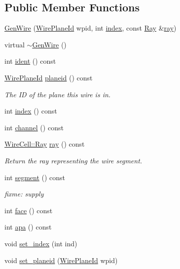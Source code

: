 \subsection*{Public Member Functions}
\begin{DoxyCompactItemize}
\item 
\hyperlink{class_wire_cell_1_1_gen_wire_a4348d145a26c787ced15ddd36c248f36}{Gen\+Wire} (\hyperlink{class_wire_cell_1_1_wire_plane_id}{Wire\+Plane\+Id} wpid, int \hyperlink{class_wire_cell_1_1_gen_wire_a9d9189545db2c32b2c2e532cea2aa82e}{index}, const \hyperlink{namespace_wire_cell_a3ab20d9b438feb7eb1ffaab9ba98af0c}{Ray} \&\hyperlink{class_wire_cell_1_1_gen_wire_a8938590c1c476c57de50ff087f67b8f0}{ray})
\item 
virtual \hyperlink{class_wire_cell_1_1_gen_wire_a629bbab9ccbfd225d00209d81f93e1c1}{$\sim$\+Gen\+Wire} ()
\item 
int \hyperlink{class_wire_cell_1_1_gen_wire_a5656bd4873e5160e01eea7fa923b3859}{ident} () const
\item 
\hyperlink{class_wire_cell_1_1_wire_plane_id}{Wire\+Plane\+Id} \hyperlink{class_wire_cell_1_1_gen_wire_a3c2544d86575773427983718795ad6b5}{planeid} () const
\begin{DoxyCompactList}\small\item\em The ID of the plane this wire is in. \end{DoxyCompactList}\item 
int \hyperlink{class_wire_cell_1_1_gen_wire_a9d9189545db2c32b2c2e532cea2aa82e}{index} () const
\item 
int \hyperlink{class_wire_cell_1_1_gen_wire_a98e2ccfbe7f784cdcddbb49e8097be6f}{channel} () const
\item 
\hyperlink{namespace_wire_cell_a3ab20d9b438feb7eb1ffaab9ba98af0c}{Wire\+Cell\+::\+Ray} \hyperlink{class_wire_cell_1_1_gen_wire_a8938590c1c476c57de50ff087f67b8f0}{ray} () const
\begin{DoxyCompactList}\small\item\em Return the ray representing the wire segment. \end{DoxyCompactList}\item 
int \hyperlink{class_wire_cell_1_1_gen_wire_a27ade571103d3591a7addd4ff9dd757f}{segment} () const
\begin{DoxyCompactList}\small\item\em fixme\+: supply \end{DoxyCompactList}\item 
int \hyperlink{class_wire_cell_1_1_gen_wire_a7ca54f497f3e6f3690ca4f754e192427}{face} () const
\item 
int \hyperlink{class_wire_cell_1_1_gen_wire_a00d554142db2c73522bb723a9c484aaa}{apa} () const
\item 
void \hyperlink{class_wire_cell_1_1_gen_wire_a792eed6c415ceb057cd4f248bdc5e512}{set\+\_\+index} (int ind)
\item 
void \hyperlink{class_wire_cell_1_1_gen_wire_a66c7d91a5646e440a492f785e7bc868d}{set\+\_\+planeid} (\hyperlink{class_wire_cell_1_1_wire_plane_id}{Wire\+Plane\+Id} wpid)
\end{DoxyCompactItemize}
